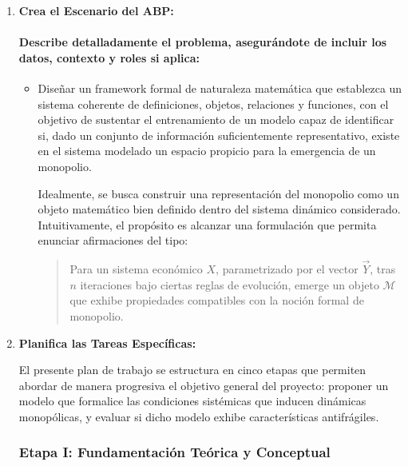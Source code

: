 \documentclass[a4paper,12pt]{article}
\begin{document}
\begin{enumerate}
\begin{enumerate}
    \end{enumerate}
    \item \textbf{Crea el Escenario del ABP:}
    \paragraph{Describe detalladamente el problema, asegurándote de incluir los datos, contexto y roles si aplica:}
    \begin{itemize}
        \item Diseñar un framework formal de naturaleza matemática que establezca un sistema coherente de definiciones, objetos, relaciones y funciones, con el objetivo de sustentar el entrenamiento de un modelo capaz de identificar si, dado un conjunto de información suficientemente representativo, existe en el sistema modelado un espacio propicio para la emergencia de un monopolio.

Idealmente, se busca construir una representación del monopolio como un objeto matemático bien definido dentro del sistema dinámico considerado. Intuitivamente, el propósito es alcanzar una formulación que permita enunciar afirmaciones del tipo:
\begin{quote}
    Para un sistema económico \( X \), parametrizado por el vector \( \vec{Y} \), tras \( n \) iteraciones bajo ciertas reglas de evolución, emerge un objeto \( \mathcal{M} \) que exhibe propiedades compatibles con la noción formal de monopolio.
\end{quote}


    \end{itemize}

    \item \textbf{Planifica las Tareas Específicas:}
   
El presente plan de trabajo se estructura en cinco etapas que permiten abordar de manera progresiva el objetivo general del proyecto: proponer un modelo que formalice las condiciones sistémicas que inducen dinámicas monopólicas, y evaluar si dicho modelo exhibe características antifrágiles.

\subsubsection*{Etapa I: Fundamentación Teórica y Conceptual}


\end{enumerate}
\end{document}
